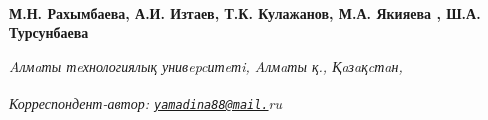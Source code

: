 
\begin{articleheader}

{\bfseries
М.Н. Рахымбаева\authorid,
А.И. Изтаев\authorid,
Т.К. Кулажанов\authorid,
М.А. Якияева\textsuperscript{\envelope } \authorid,
Ш.А. Турсунбаева\authorid}
\end{articleheader}

\begin{affiliation}
\emph{Aлмaты тeхнологиялық унивepcитeтi, Aлмaты қ., Қaзaқcтaн,}

\raggedright \textsuperscript{\envelope }{\em Корреспондент-автор: \href{mailto:yamadina88@mail.}{\nolinkurl{yamadina88@mail.}}ru}
\end{affiliation}

